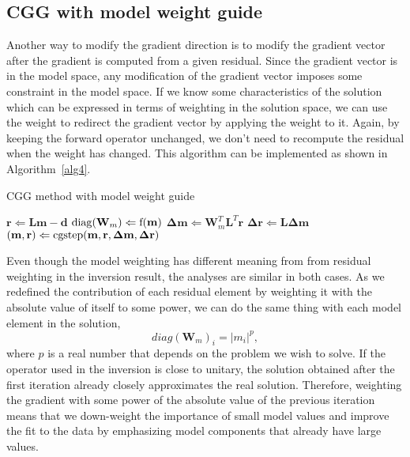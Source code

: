 \subsection{CGG with model weight guide}
Another way to modify the gradient direction
is to modify the gradient vector after the gradient is computed
from a given residual.
Since the gradient vector is in the model space, 
any modification of the gradient vector imposes
some constraint in the model space.
If we know some characteristics of the solution 
which can be expressed in terms of weighting in the solution space, 
we can use the weight to redirect the gradient vector by applying the weight to it.
Again, by keeping the forward operator unchanged, 
we don't need to recompute the residual when the weight has changed.
This algorithm can be implemented as shown in Algorithm~\ref{alg4}.

\begin{algorithm}
\caption{ CGG method with model weight guide}
\label{alg4}
\begin{algorithmic}
\STATE $ \mathbf r \Leftarrow \mathbf L \mathbf m - \mathbf d $
\STATE $ {\rm diag } (\mathbf W_m )\Leftarrow \rm f (\mathbf m) $
\STATE $ \mathbf \Delta \mathbf m \Leftarrow \mathbf W_m^T \mathbf L^T \mathbf r $
\STATE $ \mathbf \Delta \mathbf r \Leftarrow \mathbf L \mathbf \Delta \mathbf m $
\STATE $ (\mathbf m, \mathbf r) \Leftarrow \rm cgstep(\mathbf m, \mathbf r, \mathbf \Delta \mathbf m, \mathbf \Delta \mathbf r)  $
\ENDWHILE
\end{algorithmic}
\end{algorithm}

Even though the model weighting has  
different meaning from from residual weighting in the inversion result, 
the analyses are similar in both cases.
As we redefined the contribution of each residual element
by weighting it with the absolute value of itself to some power,
we can do the same thing with each model element in the solution,
\begin{equation}
\label{eqn:modelweight}
diag({\mathbf W_m})_i = |m_i|^{p} ,
\end{equation}
where $p$ is a real number that depends on the problem we wish to solve.
If the operator used in the inversion is close to unitary,
the solution obtained after the first iteration already 
closely approximates the real solution.
Therefore, weighting the gradient 
with some power of the absolute value of the previous
iteration means that we down-weight the importance of small model values 
and improve the fit to the data by emphasizing model components 
that already have large values.


